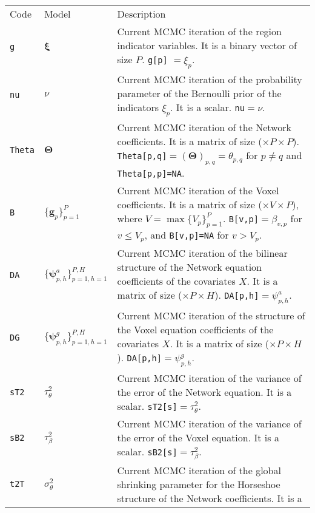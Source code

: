 \documentclass[
]{article}
\begin{document}
\begin{longtable}[]{@{}
  >{\raggedleft\arraybackslash}p{}
  >{\centering\arraybackslash}p{}
  >{\raggedright\arraybackslash}p{}@{}}
\toprule\noalign{}
\endhead
\bottomrule\noalign{}
\endlastfoot
Code & Model & Description \\
\texttt{g} & \( {\boldsymbol \xi} \) & Current MCMC iteration of the region indicator variables. It is a binary
vector of size \(P\). \texttt{g{[}p{]}} \(={\xi_p}\). \\
\texttt{nu} & \(\nu\) & Current MCMC iteration of the probability parameter of the Bernoulli prior of the indicators \(\xi_p\). It is a scalar.
\texttt{nu}\(=\nu\). \\
\texttt{Theta} & \( {\boldsymbol \Theta} \) & Current MCMC iteration of the Network coefficients. It is a matrix of size (\(\times P \times P\)).
\texttt{Theta{[}p,q{]}}\(=( {\boldsymbol \Theta} )_{p,q}=\theta_{p,q}\) for \(p\neq q\) and \texttt{Theta{[}p,p{]}=NA}. \\
\texttt{B} & \(\{ {\boldsymbol g} _p\}_{p=1}^P\) & Current MCMC iteration of the Voxel coefficients. It is a matrix of size (\(\times V \times P\)), where \(V=\max\{V_p\}_{p=1}^P\).
\texttt{B{[}v,p{]}}\(=\beta_{v,p}\) for \(v \leq V_p\), and \texttt{B{[}v,p{]}=NA} for \(v > V_p\). \\
\texttt{DA} & \(\{ {\boldsymbol \psi} _{p,h}^a\}_{p=1,h=1}^{P,H}\) & Current MCMC iteration of the bilinear structure of the Network equation coefficients of the covariates \(X\). It is a matrix of
size (\(\times P \times H\)). \texttt{DA{[}p,h{]}}\(= {\psi_{p,h}^{a}}\). \\
\texttt{DG} & \(\{ {\boldsymbol \psi} _{p,h}^g\}_{p=1,h=1}^{P,H}\) & Current MCMC iteration of the structure of the Voxel equation coefficients of the covariates \(X\). It is a matrix of size
(\(\times P \times H\)). \texttt{DA{[}p,h{]}}\(= {\psi_{p,h}^{g}}\). \\
\texttt{sT2} & \(\tau^2_\theta\) & Current MCMC iteration of the variance of the error of the Network equation. It is a scalar. \texttt{sT2{[}s{]}}\(= {\tau^2_\theta}\). \\
\texttt{sB2} & \(\tau^2_\beta\) & Current MCMC iteration of the variance of the error of the Voxel equation. It is a scalar. \texttt{sB2{[}s{]}}\(= {\tau^2_\beta}\). \\
\texttt{t2T} & \(\sigma_\theta^2\) & Current MCMC iteration of the global shrinking parameter for the Horseshoe structure of the Network coefficients. It is a

\end{longtable}
\end{document}
